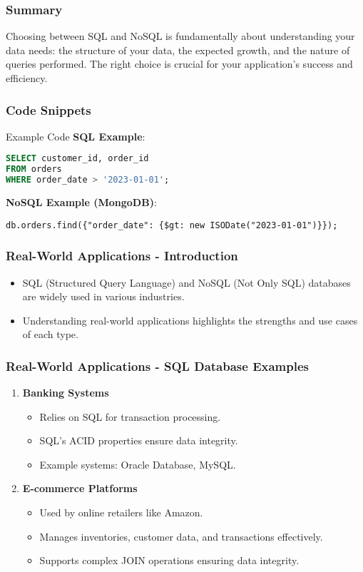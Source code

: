 \documentclass[aspectratio=169]{beamer}
\begin{document}
\begin{frame}[fragile]
    \frametitle{Summary}
    Choosing between SQL and NoSQL is fundamentally about understanding your data needs: the structure of your data, the expected growth, and the nature of queries performed. The right choice is crucial for your application's success and efficiency.
\end{frame}

\begin{frame}[fragile]
    \frametitle{Code Snippets}
    \begin{block}{Example Code}
        \textbf{SQL Example}:
        \begin{lstlisting}[language=SQL]
SELECT customer_id, order_id 
FROM orders 
WHERE order_date > '2023-01-01';
        \end{lstlisting}

        \textbf{NoSQL Example (MongoDB)}:
        \begin{lstlisting}
db.orders.find({"order_date": {$gt: new ISODate("2023-01-01")}});
        \end{lstlisting}
    \end{block}
\end{frame}

\begin{frame}[fragile]
    \frametitle{Real-World Applications - Introduction}
    \begin{itemize}
        \item SQL (Structured Query Language) and NoSQL (Not Only SQL) databases are widely used in various industries.
        \item Understanding real-world applications highlights the strengths and use cases of each type.
    \end{itemize}
\end{frame}

\begin{frame}[fragile]
    \frametitle{Real-World Applications - SQL Database Examples}
    \begin{enumerate}
        \item \textbf{Banking Systems}
            \begin{itemize}
                \item Relies on SQL for transaction processing.
                \item SQL's ACID properties ensure data integrity.
                \item Example systems: Oracle Database, MySQL.
            \end{itemize}
        \item \textbf{E-commerce Platforms}
            \begin{itemize}
                \item Used by online retailers like Amazon.
                \item Manages inventories, customer data, and transactions effectively.
                \item Supports complex JOIN operations ensuring data integrity.
            \end{itemize}
    \end{enumerate}
\end{frame}
\end{document}
